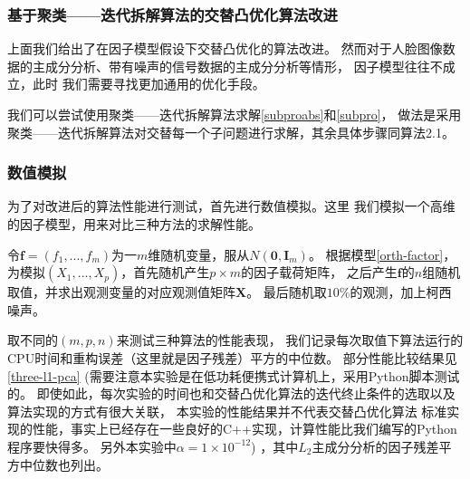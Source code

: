\subsubsection{基于聚类——迭代拆解算法的交替凸优化算法改进}
上面我们给出了在因子模型假设下交替凸优化的算法改进。
然而对于人脸图像数据的主成分分析、带有噪声的信号数据的主成分分析等情形，
因子模型往往不成立，此时
我们需要寻找更加通用的优化手段。

我们可以尝试使用聚类——迭代拆解算法求解\eqref{subproabs}和\eqref{subpro}，
做法是采用聚类——迭代拆解算法对交替每一个子问题进行求解，其余具体步骤同算法2.1。

\subsubsection{数值模拟}
为了对改进后的算法性能进行测试，首先进行数值模拟。这里
我们模拟一个高维的因子模型，用来对比三种方法的求解性能。

令$\bm{f} = (f_1, ..., f_m)$为一$m$维随机变量，服从$N(\bm{0}, \bm{I}_m)$。
根据模型\eqref{orth-factor}，为模拟$(X_1, ..., X_p)$，首先随机产生$p\times m$的因子载荷矩阵，
之后产生$\bm{f}$的$n$组随机取值，并求出观测变量的对应观测值矩阵$\bm X $。
最后随机取$10\%$的观测，加上柯西噪声。

取不同的$(m, p, n)$来测试三种算法的性能表现，
我们记录每次取值下算法运行的CPU时间和重构误差（这里就是因子残差）平方的中位数。
部分性能比较结果见\ref{three-l1-pca}
(需要注意本实验是在低功耗便携式计算机上，采用Python脚本测试的。
即使如此，每次实验的时间也和交替凸优化算法的迭代终止条件的选取以及算法实现的方式有很大关联，
本实验的性能结果并不代表交替凸优化算法
标准实现的性能，事实上已经存在一些良好的C++实现，计算性能比我们编写的Python程序要快得多。
另外本实验中$\alpha = 1\times10^{-12}$)
，其中$L_2$主成分分析的因子残差平方中位数也列出。


